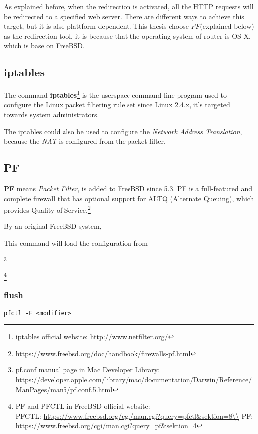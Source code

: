 As explained before, when the redirection is activated, all the HTTP requests will be redirected to a specified web server. There are different ways to achieve this target, but it is also plattform-dependent. This thesis choose \textit{PF}(explained below) as the redirection tool, it is because that the operating system of router is OS X, which is base on FreeBSD.

\subsection{iptables}

The command \textbf{iptables}\footnote{iptables official website: \url{http://www.netfilter.org/}} is the userspace command line program used to configure the Linux packet filtering rule set since Linux 2.4.x, it's targeted towards system administrators.

The iptables could also be used to configure the \textit{Network Address Translation}, because the \textit{NAT} is configured from the packet filter.

\subsection{PF}

\textbf{PF} means \textit{Packet Filter}, is added to FreeBSD since 5.3. PF is a full-featured and complete firewall that has optional support for ALTQ (Alternate Queuing), which provides Quality of Service.\footnote{\url{https://www.freebsd.org/doc/handbook/firewalls-pf.html}}

By an original FreeBSD system, 


This command will load the configuration from 

\footnote{pf.conf manual page in Mac Developer Library: \url{https://developer.apple.com/library/mac/documentation/Darwin/Reference/ManPages/man5/pf.conf.5.html}}

\footnote{PF and PFCTL in FreeBSD official website:\\ 
	PFCTL: \url{https://www.freebsd.org/cgi/man.cgi?query=pfctl&sektion=8\\}
	PF: \url{https://www.freebsd.org/cgi/man.cgi?query=pf&sektion=4}}

\subsubsection{flush}

\begin{lstlisting}
pfctl -F <modifier>
\end{lstlisting}

